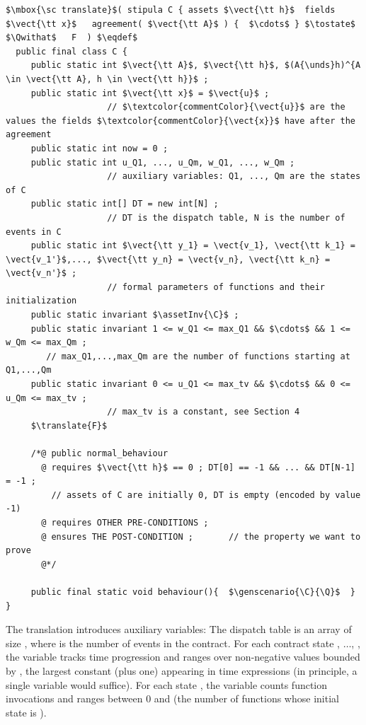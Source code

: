{\small
\begin{lstlisting}[frame=none,numbers=none,language={[JML]Java},mathescape=true,caption={The {\sc translate} function for a {\Stipula} contract},label={tab:translate}]
$\mbox{\sc translate}$( stipula C { assets $\vect{\tt h}$  fields $\vect{\tt x}$   agreement( $\vect{\tt A}$ ) {  $\cdots$ } $\tostate$ $\Qwithat$   F  ) $\eqdef$
  public final class C {
     public static int $\vect{\tt A}$, $\vect{\tt h}$, $(A{\unds}h)^{A \in \vect{\tt A}, h \in \vect{\tt h}}$ ;
     public static int $\vect{\tt x}$ = $\vect{u}$ ;
                    // $\textcolor{commentColor}{\vect{u}}$ are the values the fields $\textcolor{commentColor}{\vect{x}}$ have after the agreement
     public static int now = 0 ;
     public static int u_Q1, ..., u_Qm, w_Q1, ..., w_Qm ; 
                    // auxiliary variables: Q1, ..., Qm are the states of C
     public static int[] DT = new int[N] ;
                    // DT is the dispatch table, N is the number of events in C   
     public static int $\vect{\tt y_1} = \vect{v_1}, \vect{\tt k_1} = \vect{v_1'}$,..., $\vect{\tt y_n} = \vect{v_n}, \vect{\tt k_n} = \vect{v_n'}$ ; 
                    // formal parameters of functions and their initialization                                       
     public static invariant $\assetInv{\C}$ ;
     public static invariant 1 <= w_Q1 <= max_Q1 && $\cdots$ && 1 <= w_Qm <= max_Qm ;
        // max_Q1,...,max_Qm are the number of functions starting at Q1,...,Qm
     public static invariant 0 <= u_Q1 <= max_tv && $\cdots$ && 0 <= u_Qm <= max_tv ;
                    // max_tv is a constant, see Section 4
     $\translate{F}$
     
     /*@ public normal_behaviour
       @ requires $\vect{\tt h}$ == 0 ; DT[0] == -1 && ... && DT[N-1] = -1 ;   
         // assets of C are initially 0, DT is empty (encoded by value -1)
       @ requires OTHER PRE-CONDITIONS ;
       @ ensures THE POST-CONDITION ;       // the property we want to prove
       @*/

     public final static void behaviour(){  $\genscenario{\C}{\Q}$  }
}
\end{lstlisting}
}

The translation introduces auxiliary variables: The dispatch table
 is an array of size , where  is the number of
events in the contract.  For each contract state , $\ldots$,
, the variable  tracks time progression and ranges
over non-negative values bounded by , the largest constant
(plus one) appearing in time expressions (in principle, a single
variable would suffice).  For each state , the variable
 counts function invocations and ranges between 0 and
 (the number of functions whose initial state is
).

